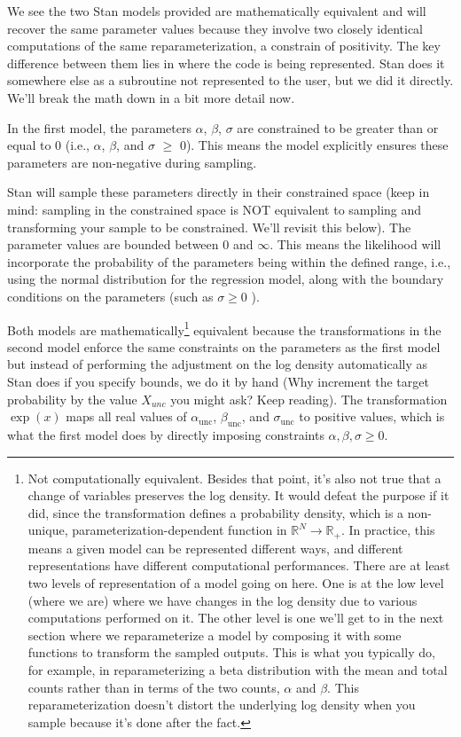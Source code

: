 \documentclass[
  letterpaper,
  DIV=11,
  numbers=noendperiod]{scrartcl}
\begin{document}
We see the two Stan models provided are mathematically equivalent and
will recover the same parameter values because they involve two closely
identical computations of the same reparameterization, a constrain of
positivity. The key difference between them lies in where the code is
being represented. Stan does it somewhere else as a subroutine not
represented to the user, but we did it directly. We'll break the math
down in a bit more detail now.

In the first model, the parameters \(\alpha\), \(\beta\), \(\sigma\) are
constrained to be greater than or equal to 0 (i.e., \(\alpha\),
\(\beta\), and \(\sigma\) \(\geq\) \(0\)). This means the model
explicitly ensures these parameters are non-negative during sampling.

Stan will sample these parameters directly in their constrained space
(keep in mind: sampling in the constrained space is NOT equivalent to
sampling and transforming your sample to be constrained. We'll revisit
this below). The parameter values are bounded between \(0\) and
\(\infty\). This means the likelihood will incorporate the probability
of the parameters being within the defined range, i.e., using the normal
distribution for the regression model, along with the boundary
conditions on the parameters (such as \(\sigma \geq 0\) ).

Both models are mathematically\footnote{Not computationally equivalent.
  Besides that point, it's also not true that a change of variables
  preserves the log density. It would defeat the purpose if it did,
  since the transformation defines a probability density, which is a
  non-unique, parameterization-dependent function in
  \(\mathbb{R}^N \to \mathbb{R}_+\). In practice, this means a given
  model can be represented different ways, and different representations
  have different computational performances. There are at least two
  levels of representation of a model going on here. One is at the low
  level (where we are) where we have changes in the log density due to
  various computations performed on it. The other level is one we'll get
  to in the next section where we reparameterize a model by composing it
  with some functions to transform the sampled outputs. This is what you
  typically do, for example, in reparameterizing a beta distribution
  with the mean and total counts rather than in terms of the two counts,
  \(\alpha\) and \(\beta\). This reparameterization doesn't distort the
  underlying log density when you sample because it's done after the
  fact.} equivalent because the transformations in the second model
enforce the same constraints on the parameters as the first model but
instead of performing the adjustment on the log density automatically as
Stan does if you specify bounds, we do it by hand (Why increment the
target probability by the value \(X_{unc}\) you might ask? Keep
reading). The transformation \(\exp(x)\) maps all real values of
\(\alpha_{\text{unc}}\), \(\beta_{\text{unc}}\), and
\(\sigma_{\text{unc}}\) to positive values, which is what the first
model does by directly imposing constraints
\(\alpha, \beta, \sigma \geq 0\).
\end{document}
